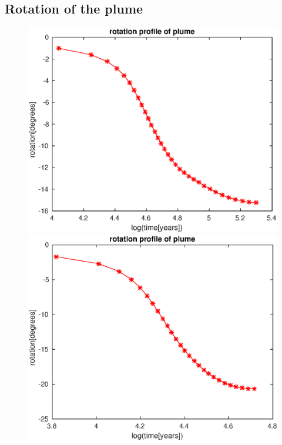 \documentclass[12pt]{scrartcl}
\begin{document}
\subsection{Rotation of the plume}

\begin{figure}
	\begin{minipage}[t]{1.0\textwidth}
		\begin{minipage}[t]{0.5\textwidth}
		\includegraphics[width=1.0\textwidth]{./Snapshots/ref/Subductionzonewithblobposrefslab20s2e7s2e7r20rotation.eps}
		\end{minipage}
		\begin{minipage}[t]{0.5\textwidth}
		\includegraphics[width=1.0\textwidth]{./Snapshots/ref/Subductionzonewithblobposrefslab30s2e7s2e7r20rotation.eps}

\end{minipage}
\end{minipage}
\end{figure}
\end{document}
